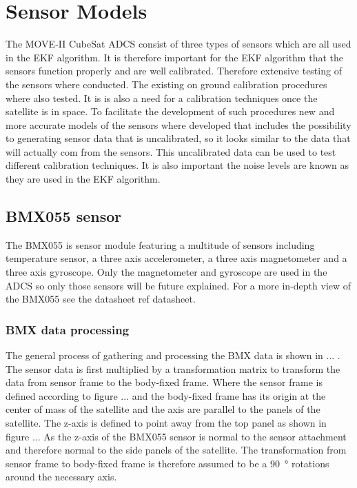 \chapter{Sensor Models}\label{chap:Sensor_models}
\ifdraft
The MOVE-II CubeSat ADCS consist of three types of sensors which are all used in the EKF algorithm. It is therefore important for the EKF algorithm that the sensors function properly and are well calibrated. Therefore extensive testing of the sensors where conducted. The existing on ground calibration procedures where also tested. It is is also a need for a calibration techniques once the satellite is in space. To facilitate the development of such procedures new and more accurate models of the sensors where developed that includes the possibility to generating sensor data that is uncalibrated, so it looks similar to the data that will actually com from the sensors. This uncalibrated data can be used to test different calibration techniques. It is also important the noise levels are known as they are used in the EKF algorithm.    


\section{BMX055 sensor}
The BMX055 is sensor module featuring a multitude of sensors including temperature sensor, a three axis accelerometer, a three axis magnetometer and a three axis gyroscope. Only the magnetometer and gyroscope are used in the ADCS so only those sensors will be future explained. For a more in-depth view of the BMX055 see the datasheet {ref datasheet}.      

\subsection{BMX data processing}
The general process of gathering and processing the BMX data is shown in ... . The sensor data is first multiplied by a transformation matrix to transform the data from sensor frame to the body-fixed frame. Where the sensor frame is defined according to figure ... and the body-fixed frame has its origin at the center of mass of the satellite and the axis are parallel to the panels of the satellite. The z-axis is defined to point away from the top panel as shown in figure ... As the z-axis of the BMX055 sensor is normal to the sensor attachment and therefore normal to the side panels of the satellite. The transformation from sensor frame to body-fixed frame is therefore assumed to be a \SI{90}{\degree} rotations around the necessary axis.

